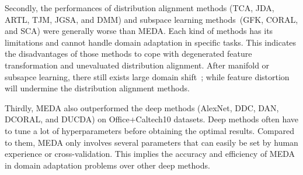 \documentclass[sigconf]{acmart}
\begin{document}
Secondly, the performances of distribution alignment methods (TCA, JDA, ARTL, TJM, JGSA, and DMM) and subspace learning methods~(GFK, CORAL, and SCA) were generally worse than MEDA. Each kind of methods has its limitations and cannot handle domain adaptation in specific tasks. This indicates the disadvantages of those methods to cope with degenerated feature transformation and unevaluated distribution alignment. After manifold or subsapce learning, there still exists large domain shift~\cite{baktashmotlagh2013unsupervised}; while feature distortion will undermine the distribution alignment methods. 

Thirdly, MEDA also outperformed the deep methods (AlexNet, DDC, DAN, DCORAL, and DUCDA) on Office+Caltech10 datasets. Deep methods often have to tune a lot of hyperparameters before obtaining the optimal results. Compared to them, MEDA only involves several parameters that can easily be set by human experience or cross-validation. This implies the accuracy and efficiency of MEDA in domain adaptation problems over other deep methods.



\begin{table}[t!]
	\centering
	\vspace{-.1in}
	\caption{Mean and standard deviation of accuracy in feature learning in both original and manifold space.}
	\vspace{-.15in}
	\label{tb-gfk}
\end{table}
\end{document}
